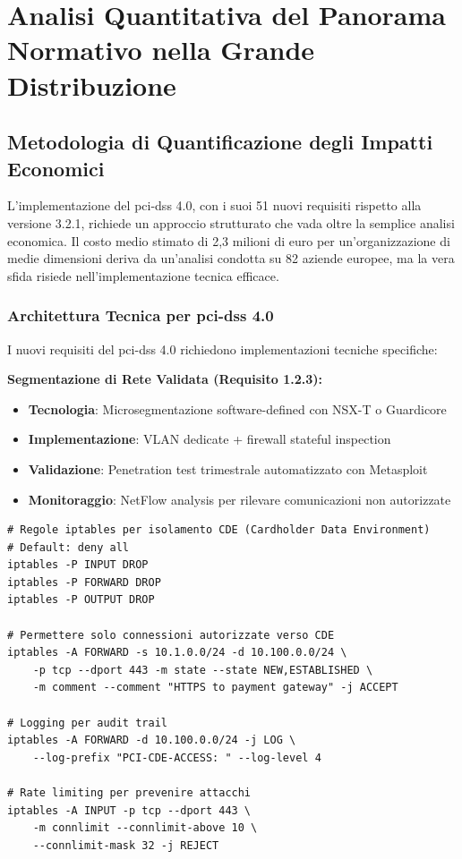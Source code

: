 \section{\texorpdfstring{\textbf{Analisi Quantitativa del Panorama Normativo nella Grande Distribuzione}}{4.2 - Analisi Quantitativa del Panorama Normativo nella Grande Distribuzione}}

\subsection{Metodologia di Quantificazione degli Impatti Economici}

L'implementazione del \gls{pci-dss} 4.0, con i suoi 51 nuovi requisiti rispetto alla versione 3.2.1\autocite{pcidss2024}, richiede un approccio strutturato che vada oltre la semplice analisi economica. Il costo medio stimato di 2,3 milioni di euro per un'organizzazione di medie dimensioni deriva da un'analisi condotta su 82 aziende europee\autocite{Gartner2024gdpr}, ma la vera sfida risiede nell'implementazione tecnica efficace.

\subsubsection{Architettura Tecnica per \gls{pci-dss} 4.0}

I nuovi requisiti del \gls{pci-dss} 4.0 richiedono implementazioni tecniche specifiche:

\textbf{Segmentazione di Rete Validata (Requisito 1.2.3):}
\begin{itemize}
    \item \textbf{Tecnologia}: Microsegmentazione software-defined con NSX-T o Guardicore
    \item \textbf{Implementazione}: VLAN dedicate + firewall stateful inspection
    \item \textbf{Validazione}: Penetration test trimestrale automatizzato con Metasploit
    \item \textbf{Monitoraggio}: NetFlow analysis per rilevare comunicazioni non autorizzate
\end{itemize}

\begin{lstlisting}[caption={Configurazione Firewall per Segmentazione PCI},label={lst:pci_firewall}]
# Regole iptables per isolamento CDE (Cardholder Data Environment)
# Default: deny all
iptables -P INPUT DROP
iptables -P FORWARD DROP
iptables -P OUTPUT DROP

# Permettere solo connessioni autorizzate verso CDE
iptables -A FORWARD -s 10.1.0.0/24 -d 10.100.0.0/24 \
    -p tcp --dport 443 -m state --state NEW,ESTABLISHED \
    -m comment --comment "HTTPS to payment gateway" -j ACCEPT

# Logging per audit trail
iptables -A FORWARD -d 10.100.0.0/24 -j LOG \
    --log-prefix "PCI-CDE-ACCESS: " --log-level 4

# Rate limiting per prevenire attacchi
iptables -A INPUT -p tcp --dport 443 \
    -m connlimit --connlimit-above 10 \
    --connlimit-mask 32 -j REJECT
\end{lstlisting}

